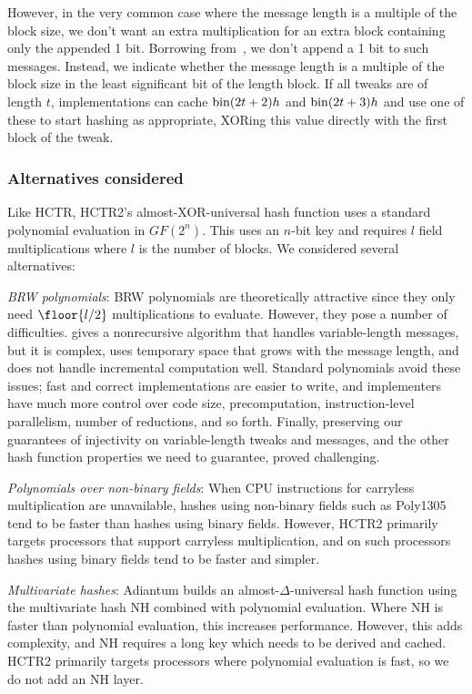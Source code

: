 \documentclass[hctr2.tex]{subfiles}
\begin{document}
However, in the very common case where 
the message length is a multiple of the block size,
we don't want an extra multiplication
for an extra block containing only the appended 1 bit.
Borrowing from~\cite{xcbc},
we don't append a 1 bit to such messages.
Instead, we indicate whether
the message length is a multiple of the block size
in the least significant bit of the length block.
If all tweaks are of length \(t\), implementations can cache
\(\operatorname{bin}(2t + 2)h\) and \(\operatorname{bin}(2t + 3)h\)
and use one of these to start hashing as appropriate,
XORing this value directly with the first block of the tweak.

\subsubsection{Alternatives considered}

Like HCTR, HCTR2's almost-XOR-universal hash function uses a standard polynomial
evaluation in $GF(2^n)$. This uses an $n$-bit key and requires $l$ field
multiplications where $l$ is the number of blocks.
We considered several alternatives:

\emph{BRW polynomials}: BRW polynomials\cite{pema}\cite{heh2} are theoretically
attractive since they only need \(\floor{l/2}\) multiplications
to evaluate. However, they pose a number of difficulties. \cite{brweval} gives a
nonrecursive algorithm that handles variable-length messages, but it is complex,
uses temporary space that grows with the message length, and does not handle
incremental computation well. Standard polynomials avoid these issues;
fast and correct implementations are easier to write,
and implementers have much more control over
code size, precomputation, instruction-level
parallelism, number of reductions, and so forth.
Finally, preserving our guarantees of injectivity on variable-length
tweaks and messages, and the other hash function properties we need
to guarantee, proved challenging.

\emph{Polynomials over non-binary fields}: When CPU instructions for carryless
multiplication are unavailable, hashes using non-binary fields such as
Poly1305\cite{poly1305} tend to be faster than hashes using binary fields.
However, HCTR2 primarily targets
processors that support carryless multiplication, 
and on such processors hashes
using binary fields tend to be faster and simpler.

\emph{Multivariate hashes}: Adiantum\cite{adiantum} builds an
almost-$\Delta$-universal hash function using the multivariate hash
NH\cite{umac1} combined with polynomial evaluation. Where NH is faster than
polynomial evaluation, this increases performance. However, this adds
complexity, and NH requires a long key which needs to be derived and cached. 
HCTR2 primarily targets processors where polynomial evaluation is fast, so
we do not add an NH layer.
\end{document}
